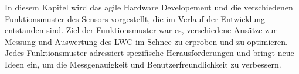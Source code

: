 
In diesem Kapitel wird das agile Hardware Developement und die verschiedenen Funktionsmuster des Sensors vorgestellt, die im Verlauf der Entwicklung entstanden sind. Ziel der Funktionsmuster war es, verschiedene Ansätze zur Messung und Auswertung des LWC im Schnee zu erproben und zu optimieren. Jedes Funktionsmuster adressiert spezifische Herausforderungen und bringt neue Ideen ein, um die Messgenauigkeit und Benutzerfreundlichkeit zu verbessern.
